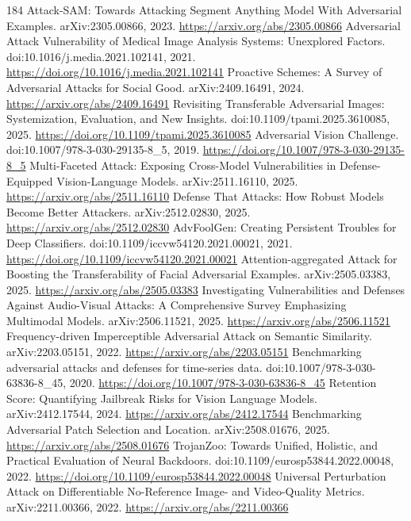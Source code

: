 \documentclass[11pt]{article}
\begin{document}
\begin{thebibliography}{184}
 Attack-SAM: Towards Attacking Segment Anything Model With Adversarial Examples. arXiv:2305.00866, 2023. \url{https://arxiv.org/abs/2305.00866}
 Adversarial Attack Vulnerability of Medical Image Analysis Systems: Unexplored Factors. doi:10.1016/j.media.2021.102141, 2021. \url{https://doi.org/10.1016/j.media.2021.102141}
 Proactive Schemes: A Survey of Adversarial Attacks for Social Good. arXiv:2409.16491, 2024. \url{https://arxiv.org/abs/2409.16491}
 Revisiting Transferable Adversarial Images: Systemization, Evaluation, and New Insights. doi:10.1109/tpami.2025.3610085, 2025. \url{https://doi.org/10.1109/tpami.2025.3610085}
 Adversarial Vision Challenge. doi:10.1007/978-3-030-29135-8\_5, 2019. \url{https://doi.org/10.1007/978-3-030-29135-8_5}
 Multi-Faceted Attack: Exposing Cross-Model Vulnerabilities in Defense-Equipped Vision-Language Models. arXiv:2511.16110, 2025. \url{https://arxiv.org/abs/2511.16110}
 Defense That Attacks: How Robust Models Become Better Attackers. arXiv:2512.02830, 2025. \url{https://arxiv.org/abs/2512.02830}
 AdvFoolGen: Creating Persistent Troubles for Deep Classifiers. doi:10.1109/iccvw54120.2021.00021, 2021. \url{https://doi.org/10.1109/iccvw54120.2021.00021}
 Attention-aggregated Attack for Boosting the Transferability of Facial Adversarial Examples. arXiv:2505.03383, 2025. \url{https://arxiv.org/abs/2505.03383}
 Investigating Vulnerabilities and Defenses Against Audio-Visual Attacks: A Comprehensive Survey Emphasizing Multimodal Models. arXiv:2506.11521, 2025. \url{https://arxiv.org/abs/2506.11521}
 Frequency-driven Imperceptible Adversarial Attack on Semantic Similarity. arXiv:2203.05151, 2022. \url{https://arxiv.org/abs/2203.05151}
 Benchmarking adversarial attacks and defenses for time-series data. doi:10.1007/978-3-030-63836-8\_45, 2020. \url{https://doi.org/10.1007/978-3-030-63836-8_45}
 Retention Score: Quantifying Jailbreak Risks for Vision Language Models. arXiv:2412.17544, 2024. \url{https://arxiv.org/abs/2412.17544}
 Benchmarking Adversarial Patch Selection and Location. arXiv:2508.01676, 2025. \url{https://arxiv.org/abs/2508.01676}
 TrojanZoo: Towards Unified, Holistic, and Practical Evaluation of Neural Backdoors. doi:10.1109/eurosp53844.2022.00048, 2022. \url{https://doi.org/10.1109/eurosp53844.2022.00048}
 Universal Perturbation Attack on Differentiable No-Reference Image- and Video-Quality Metrics. arXiv:2211.00366, 2022. \url{https://arxiv.org/abs/2211.00366}

\end{thebibliography}
\end{document}
